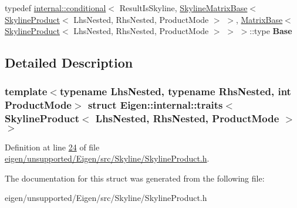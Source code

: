 \begin{DoxyCompactItemize}
typedef \hyperlink{struct_eigen_1_1internal_1_1conditional}{internal\+::conditional}$<$ Result\+Is\+Skyline, \hyperlink{class_eigen_1_1_skyline_matrix_base}{Skyline\+Matrix\+Base}$<$ \hyperlink{class_eigen_1_1internal_1_1_skyline_product}{Skyline\+Product}$<$ Lhs\+Nested, Rhs\+Nested, Product\+Mode $>$ $>$, \hyperlink{group___core___module_class_eigen_1_1_matrix_base}{Matrix\+Base}$<$ \hyperlink{class_eigen_1_1internal_1_1_skyline_product}{Skyline\+Product}$<$ Lhs\+Nested, Rhs\+Nested, Product\+Mode $>$ $>$ $>$\+::type {\bfseries Base}
\end{DoxyCompactItemize}


\subsection{Detailed Description}
\subsubsection*{template$<$typename Lhs\+Nested, typename Rhs\+Nested, int Product\+Mode$>$\newline
struct Eigen\+::internal\+::traits$<$ Skyline\+Product$<$ Lhs\+Nested, Rhs\+Nested, Product\+Mode $>$ $>$}



Definition at line \hyperlink{eigen_2unsupported_2_eigen_2src_2_skyline_2_skyline_product_8h_source_l00024}{24} of file \hyperlink{eigen_2unsupported_2_eigen_2src_2_skyline_2_skyline_product_8h_source}{eigen/unsupported/\+Eigen/src/\+Skyline/\+Skyline\+Product.\+h}.



The documentation for this struct was generated from the following file\+:\begin{DoxyCompactItemize}
\item 
eigen/unsupported/\+Eigen/src/\+Skyline/\+Skyline\+Product.\+h\end{DoxyCompactItemize}
